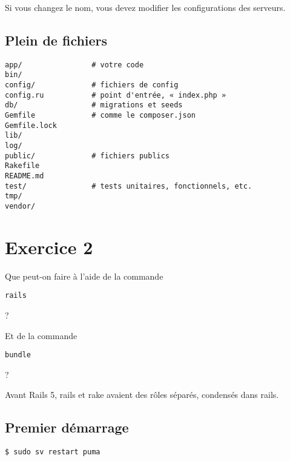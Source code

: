 Si vous changez le nom, vous devez modifier les configurations des
serveurs.

\hypertarget{plein-de-fichiers}{%
\subsection{Plein de fichiers}\label{plein-de-fichiers}}

\begin{otherlanguage}{english}

\begin{verbatim}
app/                # votre code
bin/
config/             # fichiers de config
config.ru           # point d'entrée, « index.php »
db/                 # migrations et seeds
Gemfile             # comme le composer.json
Gemfile.lock
lib/
log/
public/             # fichiers publics
Rakefile
README.md
test/               # tests unitaires, fonctionnels, etc.
tmp/
vendor/
\end{verbatim}

\end{otherlanguage}

\hypertarget{exercice-2}{%
\section{Exercice 2}\label{exercice-2}}

Que peut-on faire à l'aide de la commande
\begin{otherlanguage}{english}\texttt{rails}\end{otherlanguage}?

Et de la commande
\begin{otherlanguage}{english}\texttt{bundle}\end{otherlanguage}?

Avant Rails 5, rails et rake avaient des rôles séparés, condensés dans
rails.

\hypertarget{premier-duxe9marrage}{%
\subsection{Premier démarrage}\label{premier-duxe9marrage}}

\begin{otherlanguage}{english}

\begin{verbatim}
$ sudo sv restart puma
\end{verbatim}

\end{otherlanguage}

